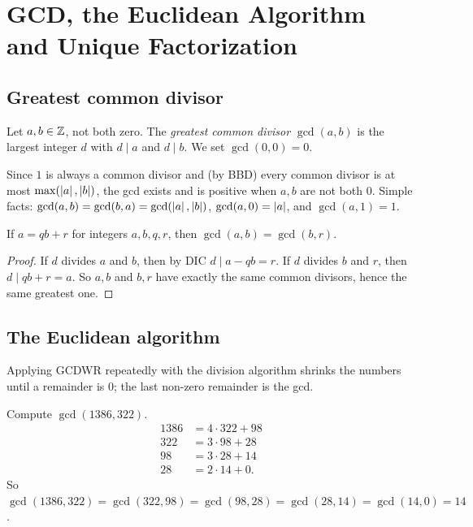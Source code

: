 \chapter{GCD, the Euclidean Algorithm and Unique Factorization}

\section{Greatest common divisor}

\begin{definition}
Let $a,b \in \mathbb{Z}$, not both zero. The \emph{greatest common divisor} $\gcd(a,b)$ is the largest
integer $d$ with $d \mid a$ and $d \mid b$. We set $\gcd(0,0) = 0$.
\end{definition}

Since $1$ is always a common divisor and (by BBD) every common divisor is at most
$\max(\left\lvert a \right\rvert,\left\lvert b \right\rvert)$, the gcd exists and is positive when $a,b$ are not both $0$.
Simple facts: $\gcd(a,b) = \gcd(b,a) = \gcd(\left\lvert a \right\rvert,\left\lvert b \right\rvert)$, $\gcd(a,0) = \left\lvert a \right\rvert$, and
$\gcd(a,1) = 1$.

\begin{proposition}
If $a = qb + r$ for integers $a,b,q,r$, then $\gcd(a,b) = \gcd(b,r)$.
\end{proposition}
\begin{proof}
If $d$ divides $a$ and $b$, then by DIC $d \mid a - qb = r$. If $d$ divides $b$ and $r$, then
$d \mid qb + r = a$. So $a,b$ and $b,r$ have exactly the same common divisors, hence the same
greatest one.
\end{proof}

\section{The Euclidean algorithm}

Applying GCDWR repeatedly with the division algorithm shrinks the numbers until a remainder
is $0$; the last non-zero remainder is the gcd.

\begin{example}
Compute $\gcd(1386, 322)$.
\begin{align*}
1386 &= 4\cdot 322 + 98\\
322 &= 3 \cdot 98 + 28\\
98 &= 3\cdot 28 + 14\\
28 &= 2\cdot 14 + 0.
\end{align*}
So $\gcd(1386,322) = \gcd(322,98) = \gcd(98,28) = \gcd(28,14) = \gcd(14,0) = 14$.
\end{example}

